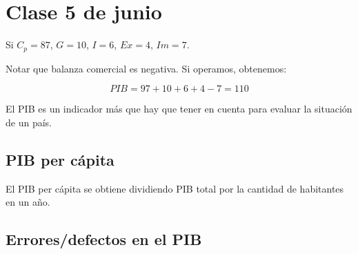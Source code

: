 \section{Clase 5 de junio}

Si \(C_p = 87\),
\(G = 10\),
\(I = 6\),
\(Ex = 4\),
\(Im = 7\).

Notar que balanza comercial es negativa.
Si operamos, obtenemos:

\begin{equation*}
    PIB = 97 + 10 + 6 + 4 - 7 = \boxed{110}
\end{equation*}

El PIB es un indicador más que hay que tener en cuenta
para evaluar la situación de un país.

\subsection{PIB per cápita}

El PIB per cápita se obtiene dividiendo
PIB total por la cantidad de habitantes en un año.

\subsection{Errores/defectos en el PIB}

